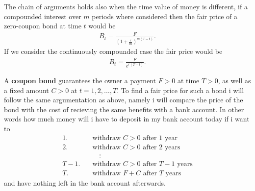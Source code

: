 \documentclass{article}
\theoremstyle{definition}
\numberwithin{equation}{section}
\begin{document}
The chain of arguments holds also when the time value of money is different, if a compounded interest over $m$ periods where considered then the fair price of a zero-coupon bond at time $t$ would be
\begin{align}
    B_t = \frac{F}{\left(1 + \frac{r}{m}\right)^{m(T - t)}}.
\end{align}
If we consider the continuously compounded case the fair price would be
\begin{align}
    B_t = \frac{F}{e^{r(T -t)}}.
\end{align}

A \textbf{coupon bond} guarantees the owner a payment $F > 0$ at time $T > 0$, as well as a fixed amount $C > 0$ at $t = 1,2,\ldots,T$.
To find a fair price for such a bond i will follow the same argumentation as above, namely i will compare the price of the bond with the cost of recieving the same benefits with a bank account.
In other words how much money will i have to deposit in my bank account today if i want to
\begin{align}
    \text{1.} \quad &\text{withdraw $C > 0$ after 1 year} \\
    \text{2.} \quad &\text{withdraw $C > 0$ after 2 years} \\
    &\quad \vdots \\
    \text{$T-1$.} \quad &\text{withdraw $C > 0$ after $T-1$ years} \\
    \text{$T$.} \quad &\text{withdraw $F + C$ after $T$ years}
\end{align}
and have nothing left in the bank account afterwards.
\end{document}
